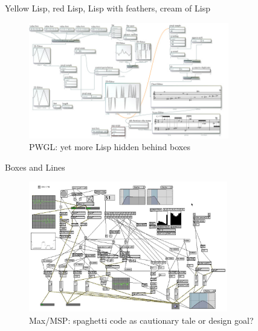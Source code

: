 \begin{frame}{Yellow Lisp, red Lisp, Lisp with feathers, cream of Lisp}
    \begin{figure}
    \begin{centering}
    \includegraphics[height=2in]{assets/include-pwgl.jpg}
    \caption{PWGL: yet more Lisp hidden behind boxes}
    \end{centering}
    \end{figure}
\end{frame}

\begin{frame}{Boxes and Lines}
    \begin{figure}
    \begin{centering}
    \includegraphics[height=2.25in]{assets/include-max.jpg}
    \caption{Max/MSP: spaghetti code as cautionary tale or design goal?}
    \end{centering}
    \end{figure}
\end{frame}